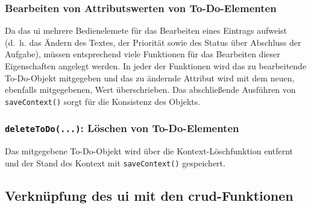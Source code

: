 \subsubsection{Bearbeiten von Attributswerten von To-Do-Elementen}
Da das \ac{ui} mehrere Bedienelemete für das Bearbeiten eines Eintrags aufweist (d.\ h. das Ändern des Textes, der Priorität sowie des Status über Abschluss der Aufgabe), müssen entsprechend viele Funktionen für das Bearbeiten dieser Eigenschaften angelegt werden. In jeder der Funktionen wird das zu bearbeitende To-Do-Objekt mitgegeben und das zu ändernde Attribut wird mit dem neuen, ebenfalls mitgegebenen, Wert überschrieben. Das abschließende Ausführen von \texttt{saveContext()} sorgt für die Konsistenz des Objekts.

\subsubsection{\texttt{deleteToDo(...)}: Löschen von To-Do-Elementen}
Das mitgegebene To-Do-Objekt wird über die Kontext-Löschfunktion entfernt und der Stand des Kontext mit \texttt{saveContext()} gespeichert.

\subsection{Verknüpfung des \ac{ui} mit den \ac{crud}-Funktionen}